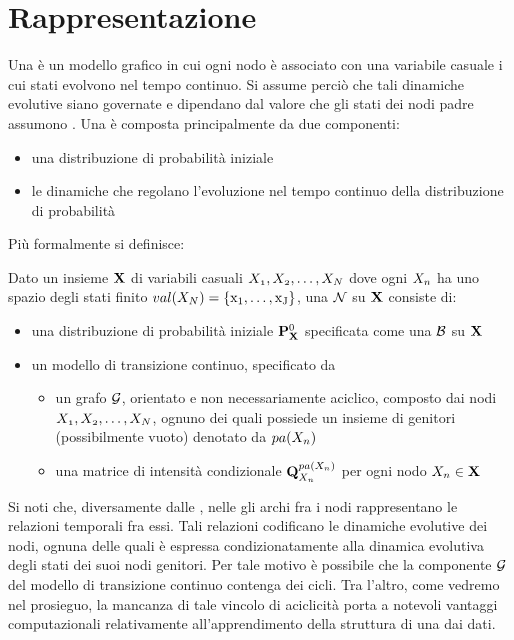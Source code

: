 \begin{definizione}
\end{definizione} 

\section{Rappresentazione}
\label{sec:rappresentazione}

Una \ctbn{} è un modello grafico in cui ogni nodo è associato con una variabile casuale i cui stati evolvono nel tempo continuo. Si assume perciò che tali dinamiche evolutive siano governate e dipendano dal valore che gli stati dei nodi padre assumono \cite{Stella2012}.
Una \ctbn{} è composta principalmente da due componenti:
\begin{itemize}
    \item una distribuzione di probabilità iniziale
    \item le dinamiche che regolano l'evoluzione nel tempo continuo della distribuzione di probabilità
\end{itemize}
Più formalmente si definisce:
\begin{definizione}[\upcase\ctbn{}]
Dato un insieme $\mathbf{X}$ di variabili casuali $\mathnormal{X_1}, \mathnormal{X_2}, \dotsc, \mathnormal{X_N}$ dove ogni $\mathnormal{X_n}$ ha uno spazio degli stati finito $val(\mathnormal{X_N})=\{ \mathrm{x_1}, \dotsc, \mathrm{x_J} \}$, una \ctbn{} $\mathcal{N}$ su $\mathbf{X}$ consiste di:
\begin{itemize}
    \item una distribuzione di probabilità iniziale $\mathbf{P}^0_{\mathbf{X}}$ specificata come una \bn{} $\mathcal{B}$ su $\mathbf{X}$
    \item un modello di transizione continuo, specificato da
    \begin{itemize}
        \item un grafo $\mathcal{G}$, orientato e non necessariamente aciclico, composto dai nodi $\mathnormal{X_1}, \mathnormal{X_2}, \dotsc, \mathnormal{X_N}$, ognuno dei quali possiede un insieme di genitori (possibilmente vuoto) denotato da $pa(\mathnormal{X_n})$
        \item una matrice di intensità condizionale $\mathbf{Q}^{pa(\mathnormal{X_n})}_{\mathnormal{X_n}}$ per ogni nodo $\mathnormal{X_n} \in \mathbf{X}$
    \end{itemize}
\end{itemize}
\end{definizione}
\begin{nota}
Si noti che, diversamente dalle \bn{}, nelle \ctbn{} gli archi fra i nodi rappresentano le relazioni temporali fra essi. Tali relazioni codificano le dinamiche evolutive dei nodi, ognuna delle quali è espressa condizionatamente alla dinamica evolutiva degli stati dei suoi nodi genitori. Per tale motivo è possibile che la componente $\mathcal{G}$ del modello di transizione continuo contenga dei cicli. Tra l'altro, come vedremo nel prosieguo, la mancanza di tale vincolo di aciclicità porta a notevoli vantaggi computazionali relativamente all'apprendimento della struttura di una \ctbn{} dai dati. 
\end{nota}

